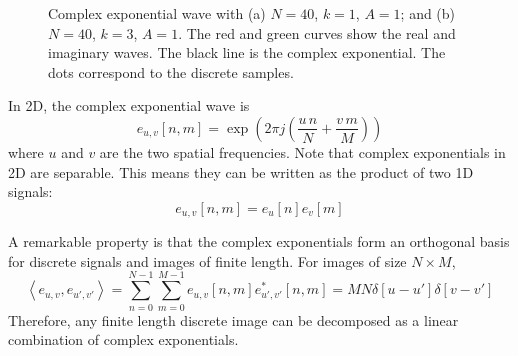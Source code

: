 \begin{figure}[t]
{{
		}
	}
	\caption{Complex exponential wave with (a) $N=40$, $k=1$, $A=1$; and (b) $N=40$, $k=3$, $A=1$. The red and green curves show the real and imaginary waves. The black line is the complex exponential. The dots correspond to the discrete samples.}
	\label{fig:complexexponential}
\end{figure}


In 2D, the complex exponential wave is
\begin{equation}
	e_{u,v}\left[n,m\right] = \exp \left(2 \pi j \left(  \frac{u\, n}{N}  + \frac{v\,m}{M}  \right) \right)
\end{equation}
where $u$ and $v$ are the two spatial frequencies. Note that complex exponentials in 2D are separable. This means they can be written as the product of two 1D signals:
\begin{equation}
	e_{u,v}\left[n,m\right]   = e_{u}\left[n\right] e_{v}\left[m\right]
\end{equation}



%

A remarkable property is that the complex exponentials form an orthogonal basis for discrete signals and images of finite length. For images of size $N \times M$,
\begin{equation}
	\left<e_{u,v}, e_{u',v'} \right> = \sum_{n=0}^{N-1} \sum_{m=0}^{M-1} e_{u,v}\left[n,m\right] e^*_{u',v'}\left[n,m\right] = MN \delta \left[u-u'\right]\delta \left[v-v'\right]
\end{equation}
Therefore, any finite length discrete image can be decomposed as a linear combination of complex exponentials.


